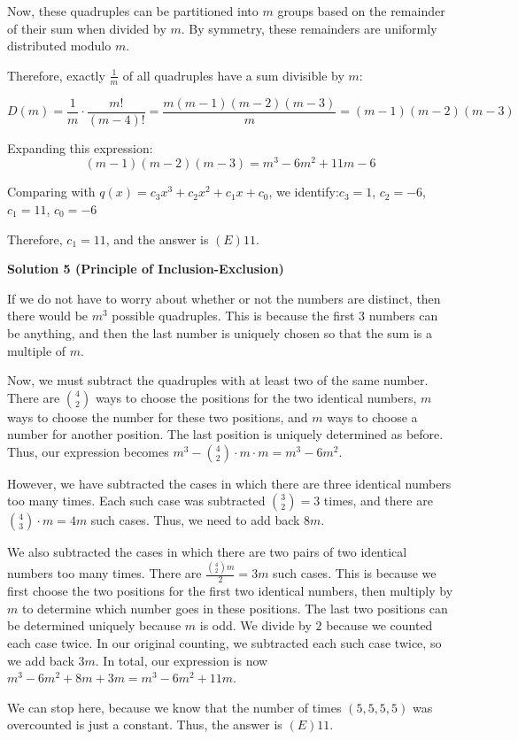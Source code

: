 \begin{enumerate}
 Now, these quadruples can be partitioned into $m$ groups based on the remainder of their sum when divided by $m$. By symmetry, these remainders are uniformly distributed modulo $m$.

 Therefore, exactly $\frac{1}{m}$ of all quadruples have a sum divisible by $m$:

 
 \[D(m) = \frac{1}{m} \cdot \frac{m!}{(m-4)!} = \frac{m(m-1)(m-2)(m-3)}{m} = (m-1)(m-2)(m-3)\]

 Expanding this expression:
 \[(m-1)(m-2)(m-3) = m^3 - 6m^2 + 11m - 6\]

 Comparing with $q(x) = c_3x^3 + c_2x^2 + c_1x + c_0$, we identify:$c_3 = 1$, $c_2 = -6$, $c_1 = 11$, $c_0 = -6$

 Therefore, $c_1 = 11$, and the answer is $\boxed{(E) 11}$.

 



\textbf{Solution 5 (Principle of Inclusion-Exclusion)}

If we do not have to worry about whether or not the numbers are distinct, then there would be $m^3$ possible quadruples. This is because the first $3$ numbers can be anything, and then the last number is uniquely chosen so that the sum is a multiple of $m$.

 Now, we must subtract the quadruples with at least two of the same number. There are $\binom{4}{2}$ ways to choose the positions for the two identical numbers, $m$ ways to choose the number for these two positions, and $m$ ways to choose a number for another position. The last position is uniquely determined as before. Thus, our expression becomes $m^3-\binom{4}{2}\cdot m\cdot m = m^3 - 6m^2$.

 However, we have subtracted the cases in which there are three identical numbers too many times. Each such case was subtracted $\binom{3}{2}=3$ times, and there are $\binom{4}{3}\cdot m=4m$ such cases. Thus, we need to add back $8m$.

 We also subtracted the cases in which there are two pairs of two identical numbers too many times. There are $\frac{\binom{4}{2}m}{2}=3m$ such cases. This is because we first choose the two positions for the first two identical numbers, then multiply by $m$ to determine which number goes in these positions. The last two positions can be determined uniquely because $m$ is odd. We divide by $2$ because we counted each case twice. In our original counting, we subtracted each such case twice, so we add back $3m$. In total, our expression is now $m^3-6m^2+8m+3m=m^3-6m^2+11m$.

 We can stop here, because we know that the number of times $(5,5,5,5)$ was overcounted is just a constant. Thus, the answer is $\boxed{(E) 11}$.

 


\end{enumerate}